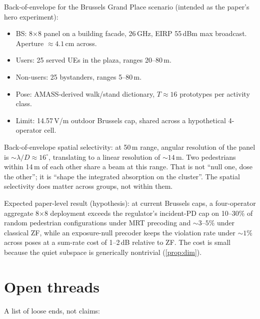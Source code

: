 \documentclass[11pt,a4paper]{article}
\theoremstyle{definition}
\begin{document}
Back-of-envelope for the Brussels Grand Place scenario (intended as
the paper's hero experiment):

\begin{itemize}[leftmargin=1.6em,itemsep=2pt]
\item BS: 8$\times$8 panel on a building facade, 26\,GHz, EIRP 55\,dBm
  max broadcast. Aperture $\approx 4.1$\,cm across.
\item Users: 25 served UEs in the plaza, ranges 20--80\,m.
\item Non-users: 25 bystanders, ranges 5--80\,m.
\item Pose: AMASS-derived walk/stand dictionary, $T\approx 16$
  prototypes per activity class.
\item Limit: 14.57\,V/m outdoor Brussels cap, shared across a
  hypothetical 4-operator cell.
\end{itemize}

Back-of-envelope spatial selectivity: at 50\,m range, angular
resolution of the panel is $\sim\!\lambda/D\approx 16^\circ$,
translating to a linear resolution of $\sim 14$\,m. Two pedestrians
within 14\,m of each other share a beam at this range. That is not
``null one, dose the other''; it is ``shape the integrated
absorption on the cluster''. The spatial selectivity does matter
across groups, not within them.

Expected paper-level result (hypothesis): at current Brussels caps,
a four-operator aggregate 8$\times$8 deployment exceeds the
regulator's incident-PD cap on 10--30\% of random pedestrian
configurations under MRT precoding and $\sim 3$--$5$\% under classical
ZF, while an exposure-null precoder keeps the violation rate under
$\sim 1$\% across poses at a sum-rate cost of 1--2\,dB relative to ZF.
The cost is small because the quiet subspace is generically
nontrivial (\cref{prop:dim}).

\section{Open threads}

A list of loose ends, not claims:
\end{document}

